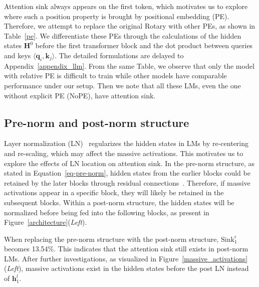\documentclass{article} \usepackage{iclr2025_conference,times}
\def\Eqref#1{Equation~\ref{#1}}
\begin{document}
Attention sink always appears on the first token, which motivates us to explore where such a position property is brought by positional embedding (PE). Therefore, we attempt to replace the original Rotary with other PEs, as shown in Table~\ref{pe}. We differentiate these PEs through the calculations of the hidden states $\boldsymbol{H}^0$ before the first transformer block and the dot product between queries and keys $\langle\boldsymbol{q}_i\textrm{,}\,\boldsymbol{k}_j\rangle$. The detailed formulations are delayed to Appendix~\ref{appendix_llm}. From the same Table, we observe that only the model with relative PE is difficult to train while other models have comparable performance under our setup. Then we note that all these LMs, even the one without explicit PE (NoPE), have attention sink.
































\vspace{-0.2cm}
\subsection{Pre-norm and post-norm structure} 
\vspace{-0.2cm}
Layer normalization (LN)~\citep{ba2016layernormalization,zhang2019root} regularizes the hidden states in LMs by re-centering and re-scaling, which may affect the massive activations. This motivates us to explore the effects of LN location on attention sink. In the pre-norm structure, as stated in \Eqref{eq-pre-norm}, hidden states from the earlier blocks could be retained by the later blocks through residual connections~\citep{he2016deep}.  Therefore, if massive activations appear in a specific block, they will likely be retained in the subsequent blocks. Within a post-norm structure, the hidden states will be normalized before being fed into the following blocks, as present in Figure~\ref{architecture}(\emph{Left}). 

When replacing the pre-norm structure with the post-norm structure, $\textrm{Sink}_1^{\epsilon}$ becomes 13.54\%. This indicates that the attention sink still exists in post-norm LMs. After further investigations, as visualized in Figure~\ref{massive_activations}(\emph{Left}), massive activations exist in the hidden states before the post LN instead of $\boldsymbol{h}_1^{l}$. 
\end{document}
